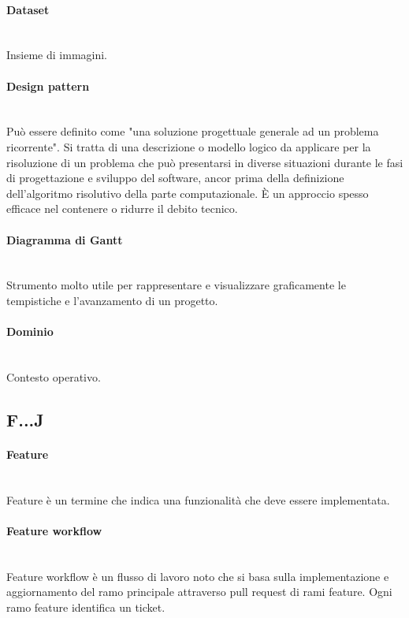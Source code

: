 \paragraph{Dataset}~\smallskip \\
Insieme di immagini.

\paragraph{Design pattern}~\smallskip \\
Può essere definito come "una soluzione progettuale generale ad un problema ricorrente".
Si tratta di una descrizione o modello logico da applicare per la risoluzione di un problema che può 
presentarsi in diverse situazioni durante le fasi di progettazione e sviluppo del software, ancor prima della definizione 
dell'algoritmo risolutivo della parte computazionale. È un approccio spesso efficace nel contenere o ridurre il debito tecnico.

\paragraph{Diagramma di Gantt}~\smallskip \\
Strumento molto utile per rappresentare e visualizzare graficamente le tempistiche e l'avanzamento di un progetto.

\paragraph{Dominio}~\smallskip \\
Contesto operativo.

\subsection{F...J}

\paragraph{Feature}~\smallskip \\
Feature è un termine che indica una funzionalità che deve essere implementata.

\paragraph{Feature workflow}~\smallskip \\
Feature workflow è un flusso di lavoro noto che si basa sulla implementazione e aggiornamento del ramo principale attraverso pull request di rami feature. Ogni ramo feature identifica un ticket.

